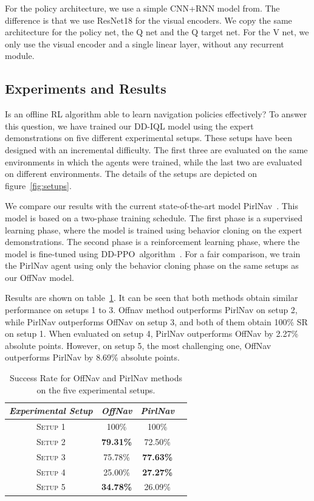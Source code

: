 For the policy architecture, we use a simple CNN+RNN model from\cite{ramrakhya2023}.
The difference is that we use ResNet18 for the visual encoders.
We copy the same architecture for the policy net, the Q net and the Q target net.
For the V net, we only use the visual encoder and a single linear layer, without any recurrent module.

\subsection{Experiments and Results}\label{subsec:experiments_offnav}

Is an offline RL algorithm able to learn navigation policies effectively?
To answer this question, we have trained our DD-IQL model using the expert demonstrations on five different experimental setups.
These setups have been designed with an incremental difficulty.
The first three are evaluated on the same environments in which the agents were trained, while the last two are evaluated on different environments.
The details of the setups are depicted on figure~\ref{fig:setups}.

We compare our results with the current state-of-the-art model PirlNav~\cite{ramrakhya2023}.
This model is based on a two-phase training schedule.
The first phase is a supervised learning phase, where the model is trained using behavior cloning on the expert demonstrations.
The second phase is a reinforcement learning phase, where the model is fine-tuned using DD-PPO~algorithm~\cite{wijmans2020}.
For a fair comparison, we train the PirlNav agent using only the behavior cloning phase on the same setups as our OffNav model.

Results are shown on table~\ref{tab:success}.
It can be seen that both methods obtain similar performance on setups 1 to 3.
Offnav method outperforms PirlNav on setup 2, while PirlNav outperforms OffNav on setup 3, and both of them obtain 100\% SR on setup 1.
When evaluated on setup 4, PirlNav outperforms OffNav by 2.27\% absolute points.
However, on setup 5, the most challenging one, OffNav outperforms PirlNav by 8.69\% absolute points.

\begin{table}
    \centering
    \begin{tabular}{c|ccc}
        \toprule
        \textit{Experimental Setup} & \textit{OffNav}  & \textit{PirlNav} \\
        \midrule
        \textsc{Setup 1}            & 100\%            & 100\%            \\
        \textsc{Setup 2}            & \textbf{79.31\%} & 72.50\%          \\
        \textsc{Setup 3}            & 75.78\%          & \textbf{77.63\%} \\
        \textsc{Setup 4}            & 25.00\%          & \textbf{27.27\%} \\
        \textsc{Setup 5}            & \textbf{34.78\%} & 26.09\%          \\
        \bottomrule
    \end{tabular}
    \caption{Success Rate for OffNav and PirlNav methods on the five experimental setups.}
    \label{tab:success}
\end{table}

